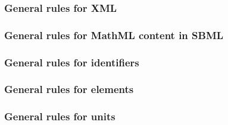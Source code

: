 \subsubsection*{General rules for XML} \begin{sbmlenum}


\end{sbmlenum} \subsubsection*{General rules for MathML content in SBML} \begin{sbmlenum}


\end{sbmlenum} \subsubsection*{General rules for identifiers}  \begin{sbmlenum}


\end{sbmlenum} \subsubsection*{General rules for  elements} \begin{sbmlenum}


\end{sbmlenum} \subsubsection*{General rules for units} \begin{sbmlenum}


\end{sbmlenum}
